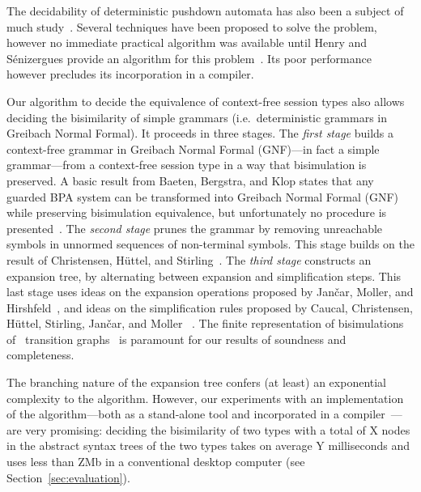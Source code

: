 
The decidability of deterministic pushdown automata has also been a
subject of much
study~\cite{janvcar2008selected,senizergues1997equivalence,stirling2001decidability}.
Several techniques have been proposed to solve the problem, however no
immediate practical algorithm was available until Henry and
Sénizergues provide an algorithm for this
problem~\cite{henry2013lalblc}. Its poor performance however precludes
its incorporation in a compiler.

Our algorithm to decide the equivalence of context-free session types
also allows deciding the bisimilarity of simple grammars (i.e.\
deterministic grammars in Greibach Normal Formal).  It proceeds in
three stages.
%
The \emph{first stage} builds a context-free grammar in Greibach
Normal Formal (GNF)---in fact a simple grammar---from a context-free
session type in a way that bisimulation is preserved.  A basic result
from Baeten, Bergstra, and Klop states that any guarded BPA system can
be transformed into Greibach Normal Formal (GNF) while preserving
bisimulation equivalence, but unfortunately no procedure is
presented~\cite{baeten1993decidability}.
%
The \emph{second stage} prunes the grammar by removing unreachable
symbols in unnormed sequences of non-terminal symbols. This stage
builds on the result of Christensen, H\"uttel, and 
Stirling~\cite{DBLP:journals/iandc/ChristensenHS95}.
%
The \emph{third stage} constructs an expansion tree, by alternating
between expansion and simplification steps.  This last stage uses
ideas on the expansion operations proposed by Jan\v car, Moller, and
Hirshfeld~\cite{hirshfeld1996bisimulation,janvcar1999techniques}, and
ideas on the simplification rules proposed by Caucal, Christensen,
H\"uttel, Stirling, Jan\v car, and Moller
~\cite{caucal1986decidabilite,DBLP:journals/iandc/ChristensenHS95,janvcar1999techniques}.
The finite representation of bisimulations of \BPA\ transition
graphs~\cite{caucal1986decidabilite,DBLP:journals/iandc/ChristensenHS95}
is paramount for our results of soundness and completeness.


The branching nature of the expansion tree confers (at least) an
exponential complexity to the algorithm.
%
However, our experiments with an implementation of the
algorithm---both as a stand-alone tool and incorporated in a
compiler~\cite{almeida.etal_freest-functional-language}---are very
promising: deciding the bisimilarity of two types with a total of X
nodes in the abstract syntax trees of the two types takes on average
Y milliseconds and uses less than ZMb in a conventional desktop
computer (see Section~\ref{sec:evaluation}).


